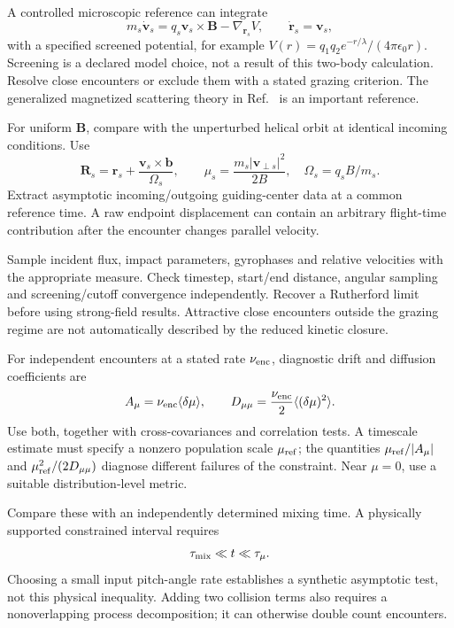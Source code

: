 \documentclass[11pt,letterpaper]{article}
\begin{document}
A controlled microscopic reference can integrate
\begin{equation}
 m_s\dot{\bm v}_s=q_s\bm v_s\times\bm B-\nabla_{\bm r_s}V,
 \qquad \dot{\bm r}_s=\bm v_s,
 \label{eq:encounter}
\end{equation}
with a specified screened potential, for example
$V(r)=q_1q_2e^{-r/\lambda}/(4\pi\epsilon_0r)$. Screening is a declared model
choice, not a result of this two-body calculation. Resolve close encounters or
exclude them with a stated grazing criterion. The generalized magnetized
scattering theory in Ref.~\cite{JB20} is an important reference.

For uniform $\bm B$, compare with the unperturbed helical orbit at identical
incoming conditions. Use
\begin{equation}
 \bm R_s=\bm r_s+\frac{\bm v_s\times\bm b}{\Omega_s},\qquad
 \mu_s=\frac{m_s|\bm v_{\perp s}|^2}{2B},\quad \Omega_s=q_sB/m_s.
\end{equation}
Extract asymptotic incoming/outgoing guiding-center data at a common reference
time. A raw endpoint displacement can contain an arbitrary flight-time
contribution after the encounter changes parallel velocity.

Sample incident flux, impact parameters, gyrophases and relative velocities with
the appropriate measure. Check timestep, start/end distance, angular sampling and
screening/cutoff convergence independently. Recover a Rutherford limit before
using strong-field results. Attractive close encounters outside the grazing
regime are not automatically described by the reduced kinetic closure.

For independent encounters at a stated rate $\nu_{\rm enc}$, diagnostic drift and
diffusion coefficients are
\begin{equation}
 A_\mu=\nu_{\rm enc}\langle\delta\mu\rangle,\qquad
 D_{\mu\mu}=\frac{\nu_{\rm enc}}2\langle(\delta\mu)^2\rangle.
 \label{eq:driftdiffusion}
\end{equation}
Use both, together with cross-covariances and correlation tests. A timescale
estimate must specify a nonzero population scale $\mu_{\rm ref}$; the quantities
$\mu_{\rm ref}/|A_\mu|$ and $\mu_{\rm ref}^2/(2D_{\mu\mu})$ diagnose different
failures of the constraint. Near $\mu=0$, use a suitable distribution-level metric.

Compare these with an independently determined mixing time. A physically
supported constrained interval requires
\begin{equation}
 \tau_{\rm mix}\ll t\ll\tau_\mu.
\end{equation}
Choosing a small input pitch-angle rate establishes a synthetic asymptotic test,
not this physical inequality. Adding two collision terms also requires a
nonoverlapping process decomposition; it can otherwise double count encounters.
\end{document}
